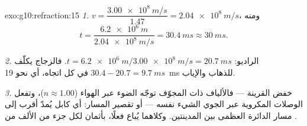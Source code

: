 \begin{solution}{exo:g10:refraction:15}
\emph{1.} $v = \dfrac{\qty{3.00e8}{m/s}}{1.47} = \qty{2.04e8}{m/s}$، ومنه
\[
t = \frac{\qty{6.2e6}{m}}{\qty{2.04e8}{m/s}} = \qty{30.4}{ms} \approx
\qty{30}{ms}.
\]

\emph{2.} الراديو: $t = \qty{6.2e6}{m}/\qty{3.00e8}{m/s} =
\qty{20.7}{ms}$. فالزجاج يكلّف $30.4 - 20.7 = \qty{9.7}{ms}$ في كل
اتجاه، أي نحو \qty{19}{ms} للذهاب والإياب.

\emph{3.} خفض القرينة --- فالألياف ذات  المجوّف توجّه الضوء عبر
الهواء ($n \approx 1.00$)، وتفعل الوصلات المكروية عبر  الجوي
الشيء نفسه --- أو تقصير المسار: أي كابل يُمدّ أقرب إلى
مسار الدائرة العظمى بين المدينتين. وكلاهما يُباع فعلًا، بأثمان
لكل جزء من الألف من .
\end{solution}

